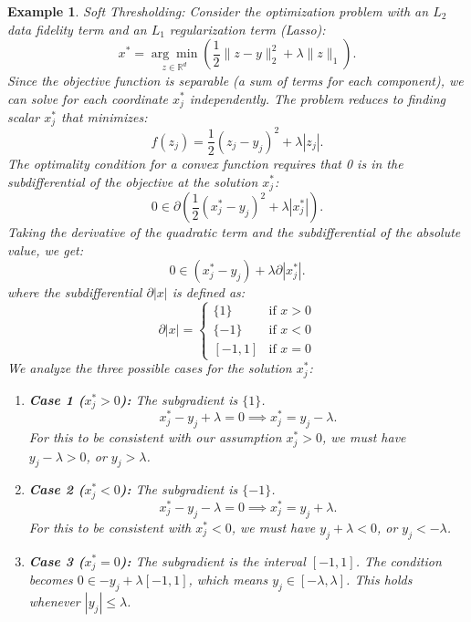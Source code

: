 \documentclass[a4paper]{article}
\newtheorem{eg}[thm]{Example}
\begin{document}
\begin{eg}
    Soft Thresholding: Consider the optimization problem with an $L_2$ data fidelity term and an $L_1$ regularization term (Lasso):
    \[
        x^* = \underset{z \in \mathbb{R}^d}{\arg\min} \left( \frac{1}{2}\|z - y\|_2^2 + \lambda\|z\|_1 \right).
    \]
    Since the objective function is separable (a sum of terms for each component), we can solve for each coordinate $x_j^*$ independently. The problem reduces to finding scalar $x_j^*$ that minimizes:
    \[
        f(z_j) = \frac{1}{2}(z_j - y_j)^2 + \lambda |z_j|.
    \]
    The optimality condition for a convex function requires that 0 is in the subdifferential of the objective at the solution $x_j^*$:
    \[
        0 \in \partial \left( \frac{1}{2}(x_j^* - y_j)^2 + \lambda |x_j^*| \right).
    \]
    Taking the derivative of the quadratic term and the subdifferential of the absolute value, we get:
    \[
        0 \in (x_j^* - y_j) + \lambda \partial |x_j^*|.
    \]
    where the subdifferential $\partial |x|$ is defined as:
    \[
        \partial |x| = 
        \begin{cases} 
            \{1\} & \text{if } x > 0 \\
            \{-1\} & \text{if } x < 0 \\
            [-1, 1] & \text{if } x = 0
        \end{cases}
    \]
    We analyze the three possible cases for the solution $x_j^*$:
    
    \begin{enumerate}
        \item \textbf{Case 1 ($x_j^* > 0$):} The subgradient is $\{1\}$.
        \[
            x_j^* - y_j + \lambda = 0 \implies x_j^* = y_j - \lambda.
        \]
        For this to be consistent with our assumption $x_j^* > 0$, we must have $y_j - \lambda > 0$, or $y_j > \lambda$.
    
        \item \textbf{Case 2 ($x_j^* < 0$):} The subgradient is $\{-1\}$.
        \[
            x_j^* - y_j - \lambda = 0 \implies x_j^* = y_j + \lambda.
        \]
        For this to be consistent with $x_j^* < 0$, we must have $y_j + \lambda < 0$, or $y_j < -\lambda$.
    
        \item \textbf{Case 3 ($x_j^* = 0$):} The subgradient is the interval $[-1, 1]$.
        The condition becomes $0 \in -y_j + \lambda [-1, 1]$, which means $y_j \in [-\lambda, \lambda]$.
        This holds whenever $|y_j| \le \lambda$.
    \end{enumerate}
    

\end{eg}
\end{document}
